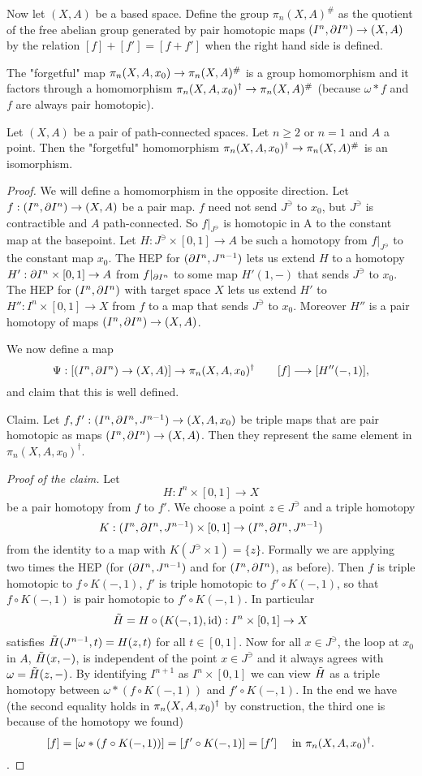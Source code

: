 Now let $(X,A)$ be a based space. Define the group $\pi_n(X,A)^\#$ as the quotient of the free abelian group generated by pair homotopic maps $(I^n,\partial I^n)\to (X,A)$ by the relation $[f]+[f']=[f+f']$ when the right hand side is defined.

The "forgetful" map $\pi_n(X,A,x_0)\to\pi_n(X,A)^\#$ is a group homomorphism and it factors through a homomorphism $\pi_n(X,A,x_0)^\dagger\to\pi_n(X,A)^\#$ (because $\omega * f$ and $f$ are always pair homotopic).

\begin{proposition}
Let $(X,A)$ be a pair of path-connected spaces. Let $n\geq2$ or $n=1$ and $A$ a point. Then the "forgetful" homomorphism $\pi_n(X,A,x_0)^\dagger\to\pi_n(X,A)^\#$ is an isomorphism.
\end{proposition}

\begin{proof}
We will define a homomorphism in the opposite direction. Let $f:(I^n,\partial I^n)\to (X,A)$ be a pair map. $f$ need not send $J^\ni$ to $x_0$, but $J^\ni$ is contractible and $A$ path-connected. So $f|_{J^\ni}$ is homotopic in A to the constant map at the basepoint. Let $H:J^\ni\times[0,1]\to A$ be such a homotopy from $f|_{J^\ni}$ to the constant map $x_0$. The HEP for $(\partial I^n,J^{n-1})$ lets us extend $H$ to a homotopy $H':\partial I^n\times[0,1]\to A$ from $f|_{\partial I^n}$ to some map $H'(1,-)$ that sends $J^\ni$ to $x_0$. The HEP for $(I^n,\partial I^n)$ with target space $X$ lets us extend $H'$ to $H'':I^n\times[0,1]\to X$ from $f$ to a map that sends $J^\ni$ to $x_0$. Moreover $H''$ is a pair homotopy of maps $(I^n,\partial I^n)\to (X,A)$.

We now define a map 
$$\Psi:[(I^n,\partial I^n)\to (X,A)]\to \pi_n(X,A,x_0)^\dagger \qquad [f] \longrightarrow [H''(-,1)],$$
and claim that this is well defined.
 
Claim. Let $f,f':(I^n,\partial I^n, J^{n-1})\to(X,A,x_0)$ be triple maps that are pair homotopic as maps $(I^n,\partial I^n)\to (X,A)$. Then they represent the same element in $\pi_n(X,A,x_0)^\dagger$.
 
\textit{Proof of the claim.} Let $$H:I^n\times[0,1]\to X$$
 be a pair homotopy from $f$ to $f'$. We choose a point $z\in J^\ni$ and a triple homotopy 
 $$K:(I^n,\partial I^n,J^{n-1})\times[0,1]\to(I^n,\partial I^n,J^{n-1})$$
  from the identity to a map with $K(J^\ni\times 1)=\{z\}$. Formally we are applying two times the HEP (for $(\partial I^n,J^{n-1})$ and for $(I^n,\partial I^n)$, as before). Then $f$ is triple homotopic to $f\circ K(-,1)$, $f'$ is triple homotopic to $f'\circ K(-,1)$, so that $f\circ K(-,1)$ is pair homotopic to $f'\circ K(-,1)$. In particular 
 $$\tilde{H}=H \circ (K(-,1),\operatorname{id}): I^n\times[0,1]\to X$$
  satisfies $\tilde{H}(J^{n-1},t)=H(z,t)$ for all $t\in [0,1]$. Now for all $x\in J^\ni$, the loop at $x_0$ in $A$, $\tilde{H}(x,-)$, is independent of the point $x\in J^\ni$ and it always agrees with $\omega=\tilde{H}(z,-)$. By identifying $I^{n+1}$ as $I^n\times[0,1]$ we can view $\tilde{H}$ as a triple homotopy between $\omega * (f\circ K(-,1))$ and $f'\circ K(-,1)$.\normalmarginpar{} In the end we have (the second equality holds in $\pi_n(X,A,x_0)^\dagger$ by construction, the third one is because of the homotopy we found)
 $$[f]=[\omega * (f\circ K(-,1))]=[f'\circ K(-,1)]=[f'] \quad \text{ in } \pi_n(X,A,x_0)^\dagger.$$
  .


\end{proof}
